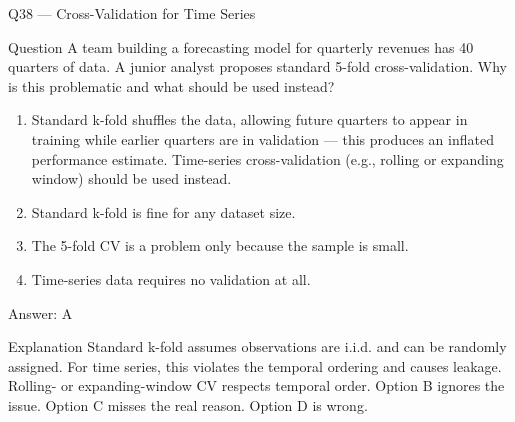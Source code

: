 \documentclass[aspectratio=169,8pt]{beamer}
\begin{document}
	\begin{frame}{Q38 --- Cross-Validation for Time Series}
		\begin{block}{Question}
			A team building a forecasting model for quarterly revenues has 40 quarters of data. A junior analyst proposes standard 5-fold cross-validation. Why is this problematic and what should be used instead?
		\end{block}
		\begin{enumerate}
			\item Standard k-fold shuffles the data, allowing future quarters to appear in training while earlier quarters are in validation --- this produces an inflated performance estimate. Time-series cross-validation (e.g., rolling or expanding window) should be used instead.
			\item Standard k-fold is fine for any dataset size.
			\item The 5-fold CV is a problem only because the sample is small.
			\item Time-series data requires no validation at all.
		\end{enumerate}
		\begin{exampleblock}{Answer: A}\end{exampleblock}
		\begin{block}{Explanation}
			Standard k-fold assumes observations are i.i.d. and can be randomly assigned. For time series, this violates the temporal ordering and causes leakage. Rolling- or expanding-window CV respects temporal order. Option B ignores the issue. Option C misses the real reason. Option D is wrong.
		\end{block}
	\end{frame}
	
\end{document}
